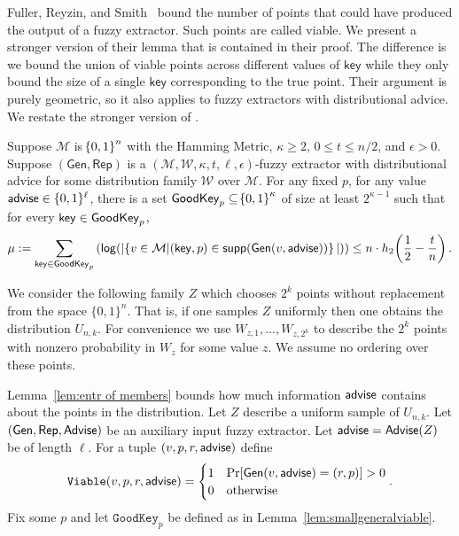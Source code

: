 Fuller, Reyzin, and Smith~\cite{fuller2016fuzzy,fuller2020fuzzy} bound the number of points that could have produced the output of a fuzzy extractor.  Such points are called viable.  We present a stronger version of their lemma that is contained in their proof.  The difference is we bound the union of viable points across different values of $\mathsf{key}$ while they only bound the size of a single $\mathsf{key}$ corresponding to the true point.  Their argument is purely geometric, so it also applies to fuzzy extractors with distributional advice. 
We restate the stronger version of \cite[Lemma 5.2]{fuller2020fuzzy}.

\begin{lemma}
    \label{lem:smallgeneralviable}
    Suppose $\mathcal{M}$ is $\!\left\{ 0,1 \right\}^{n}$ with the Hamming Metric, $\kappa \geq 2$, $0 \leq t \leq n/2$, and $\epsilon > 0$. 
    Suppose $(\mathsf{Gen, Rep})$ is a $(\mathcal{M,W},\kappa, t, \ell, \epsilon)$-fuzzy extractor with distributional advice for some distribution family $\mathcal{W}$ over $\mathcal{M}$. 
    For any fixed $p$, for any value ${\mathsf{advise}} \in \{0, 1\}^\ell$, there is a set $\mathsf{GoodKey}_p \subseteq \!\left\{ 0,1 \right\}^{\kappa}$ of size at least $2^{\kappa - 1}$ such that for every $\mathsf{key} \in \mathsf{GoodKey}_p$,
    \[
      \mu:= \sum_{\mathsf{key} \in \mathsf{GoodKey}_p} \left( \mathsf{log}\!\left(|\!\left\{ v \in \mathcal{M}|\!\left(\mathsf{key}, p\right) \in \mathsf{supp}\!\left(\mathsf{Gen}(v, {\mathsf{advise}})\right) \right\}|\right)\right) \leq n \cdot h_2\!\left(\frac{1}{2} - \frac{t}{n}\right).
    \]   
\end{lemma}

We consider the following family $Z$ which chooses $2^k$ points without replacement from the space $\{0,1\}^n$.  That is, if one samples $Z$ uniformly then one obtains the distribution $U_{n,k}$. 
For convenience we use $W_{z, 1},..., W_{z,2^k}$ to describe the $2^k$ points with nonzero probability in $W_z$ for some value $z$.  We assume no ordering over these points.  

Lemma~\ref{lem:entr of members} bounds how much information ${\mathsf{advise}}$ contains about the points in the distribution.  Let $Z$ describe a uniform sample of $U_{n,k}$.  Let $({\mathsf{Gen}}, {\mathsf{Rep}}, {\mathsf{Advise}})$ be an auxiliary input fuzzy extractor.  Let ${\mathsf{advise}} = {\mathsf{Advise}}(Z)$ be of length $\ell$.  For a tuple $(v, p, r, {\mathsf{advise}})$ define 
\[
\mathtt{Viable}(v, p, r, {\mathsf{advise}}) = \begin{cases} 1& \Pr[{\mathsf{Gen}}(v, {\mathsf{advise}}) = (r, p)]>0\\0&\text{otherwise}\end{cases}.\]
Fix some $p$ and let $\mathtt{GoodKey}_p$ be defined as in Lemma~\ref{lem:smallgeneralviable}. 

